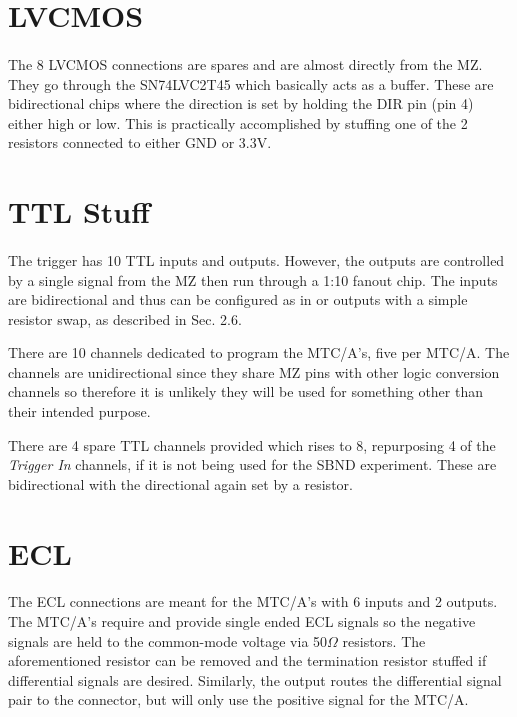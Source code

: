 \documentclass{report}
\begin{document}
\section{LVCMOS}
\paragraph{}
The 8 LVCMOS connections are spares and are almost directly from the MZ. They go through the
 SN74LVC2T45 which basically acts as a buffer. These are bidirectional chips where the direction is
  set by holding the DIR pin (pin 4) either high or low. This is practically accomplished by stuffing
   one of the 2 resistors connected to either GND or 3.3V. 

\section{TTL Stuff}
\paragraph{}
The trigger has 10 TTL inputs and outputs. However, the outputs are controlled by a single signal
 from the MZ then run through a 1:10 fanout chip. The inputs are bidirectional and thus can be
  configured as in or outputs with a simple resistor swap, as described in Sec. 2.6.

There are 10 channels dedicated to program the MTC/A's, five per MTC/A. The channels are
 unidirectional since they share MZ pins with other logic conversion channels so therefore it is
  unlikely they will be used for something other than their intended purpose.

There are 4 spare TTL channels provided which rises to 8, repurposing 4 of the \textit{Trigger In} 
channels,  if it is not being used for the SBND experiment. These are bidirectional with the directional
 again set by a resistor.

\section{ECL}
\paragraph{}
The ECL connections are meant for the MTC/A's with 6 inputs and 2 outputs. The MTC/A's require
 and provide single ended ECL signals so the negative signals are held to the common-mode
  voltage via 50$\Omega$ resistors. The aforementioned resistor can be removed and the termination
   resistor stuffed if differential signals are desired. Similarly, the output routes the differential signal
    pair to the connector, but will only use the positive signal for the MTC/A.
\end{document}
